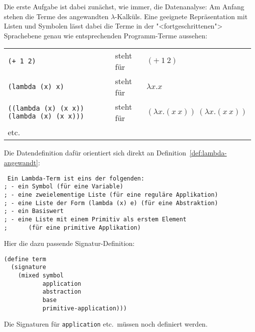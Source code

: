 Die erste Aufgabe ist dabei zunächst, wie immer, die Datenanalyse: Am
Anfang stehen die Terme des angewandten $\lambda$-Kalküls.  Eine
geeignete Repräsentation mit Listen und Symbolen lässt dabei die Terme
in der "<fortgeschrittenen"> Sprachebene genau wie entsprechenden
Programm-Terme aussehen:

\noindent\begin{tabular}{lll}
  \texttt{(+ 1 2)} & steht für & $(+~1~2)$\\
  \texttt{(lambda (x) x)} & steht für & $\lambda x.x$\\
  \texttt{((lambda (x) (x x)) (lambda (x) (x x)))} & steht für &
  $(\lambda x.(x~x))~(\lambda x.(x~x))$\\
  etc.
\end{tabular}

Die Datendefinition dafür orientiert sich direkt an
Definition~\ref{def:lambda-angewandt}:
%
\begin{verbatim}
 Ein Lambda-Term ist eins der folgenden:
; - ein Symbol (für eine Variable)
; - eine zweielementige Liste (für eine reguläre Applikation)
; - eine Liste der Form (lambda (x) e) (für eine Abstraktion)
; - ein Basiswert
; - eine Liste mit einem Primitiv als erstem Element
;      (für eine primitive Applikation)
\end{verbatim}
%
Hier die dazu passende Signatur-Definition:
%
\begin{verbatim}
(define term
  (signature
    (mixed symbol
           application
           abstraction
           base
           primitive-application)))
\end{verbatim}
%
Die Signaturen für \texttt{application} etc.\ müssen noch definiert
werden.

